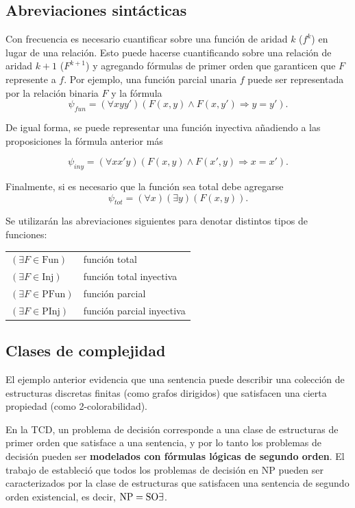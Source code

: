 \subsection{Abreviaciones sintácticas}
Con frecuencia es necesario cuantificar sobre una función de aridad $k$ ($f^k$)
en lugar de una relación. Esto puede hacerse cuantificando sobre una relación de
aridad $k+1$ ($F^{k+1}$) y agregando fórmulas de primer orden que garanticen
que $F$ represente a $f$. Por ejemplo, una función parcial unaria $f$ puede ser
representada por la relación binaria $F$ y la fórmula
\[ \psi_{fun} = (\forall xyy')(F(x, y) \land F(x, y') \Rightarrow y = y'). \]

De igual forma, se puede representar una función inyectiva añadiendo a las
proposiciones la fórmula anterior más

\[ \psi_{iny} = (\forall xx'y)(F(x, y) \land F(x', y) \Rightarrow x = x'). \]

Finalmente, si es necesario que la función sea total debe agregarse
\[ \psi_{tot} = (\forall x)(\exists y)(F(x, y)). \]

Se utilizarán las abreviaciones siguientes para denotar distintos
tipos de funciones:

\begin{tabular}{ll}
$(\exists F \in \text{Fun})$ & función total\\
$(\exists F \in \text{Inj})$ & función total inyectiva\\
$(\exists F \in \text{PFun})$ & función parcial\\
$(\exists F \in \text{PInj})$ & función parcial inyectiva\\
\end{tabular}

\subsection{Clases de complejidad}
El ejemplo anterior evidencia que una sentencia puede describir una colección
de estructuras discretas finitas (como grafos dirigidos) que satisfacen
una cierta propiedad (como 2-colorabilidad). 

En la TCD, un problema de decisión corresponde a una clase de estructuras de
primer orden que satisface a una sentencia, y por lo tanto los problemas de
decisión pueden ser \textbf{modelados con fórmulas lógicas de segundo orden}.
El trabajo de \cite{fagin:spectra} estableció que todos los problemas de
decisión en NP pueden ser caracterizados por la clase de estructuras que
satisfacen una sentencia de segundo orden existencial, es decir,
$\text{NP}=\text{SO}\exists$.

